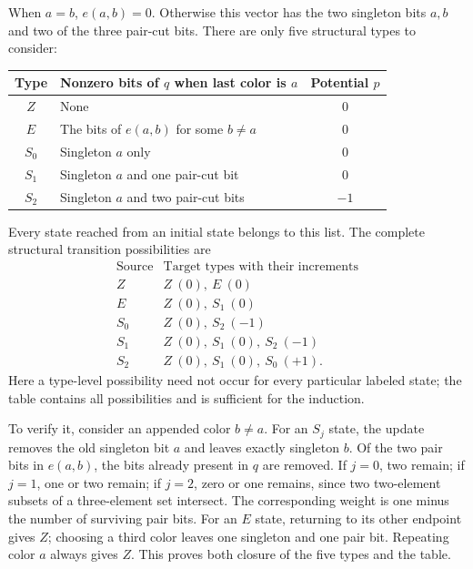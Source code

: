 \documentclass[11pt,letterpaper]{article}
\begin{document}
When $a=b$, $e(a,b)=0$. Otherwise this vector has the two singleton bits $a,b$ and two of the three pair-cut bits. There are only five structural types to consider:
\begin{center}
\begin{tabular}{@{}clc@{}}
\toprule
Type & Nonzero bits of $q$ when last color is $a$ & Potential $p$\\
\midrule
$Z$ & None & $0$\\
$E$ & The bits of $e(a,b)$ for some $b\ne a$ & $0$\\
$S_0$ & Singleton $a$ only & $0$\\
$S_1$ & Singleton $a$ and one pair-cut bit & $0$\\
$S_2$ & Singleton $a$ and two pair-cut bits & $-1$\\
\bottomrule
\end{tabular}
\end{center}
Every state reached from an initial state belongs to this list. The complete structural transition possibilities are
\begin{equation}\label{eq:table}
\begin{array}{c|l}
\text{Source}&\text{Target types with their increments}\\\hline
Z& Z\ (0),\ E\ (0)\\
E& Z\ (0),\ S_1\ (0)\\
S_0& Z\ (0),\ S_2\ (-1)\\
S_1& Z\ (0),\ S_1\ (0),\ S_2\ (-1)\\
S_2& Z\ (0),\ S_1\ (0),\ S_0\ (+1).
\end{array}
\end{equation}
Here a type-level possibility need not occur for every particular labeled state; the table contains all possibilities and is sufficient for the induction.

To verify it, consider an appended color $b\ne a$. For an $S_j$ state, the update removes the old singleton bit $a$ and leaves exactly singleton $b$. Of the two pair bits in $e(a,b)$, the bits already present in $q$ are removed. If $j=0$, two remain; if $j=1$, one or two remain; if $j=2$, zero or one remains, since two two-element subsets of a three-element set intersect. The corresponding weight is one minus the number of surviving pair bits. For an $E$ state, returning to its other endpoint gives $Z$; choosing a third color leaves one singleton and one pair bit. Repeating color $a$ always gives $Z$. This proves both closure of the five types and the table.
\end{document}
